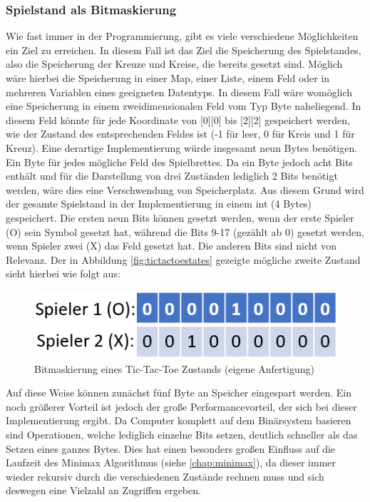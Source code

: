\subsubsection{Spielstand als Bitmaskierung}
Wie fast immer in der Programmierung, gibt es viele verschiedene Möglichkeiten ein Ziel zu erreichen. In diesem Fall ist das Ziel die Speicherung des
Spielstandes, also die Speicherung der Kreuze und Kreise, die bereits gesetzt sind. Möglich wäre hierbei die Speicherung in einer Map, einer Liste, 
einem Feld oder in mehreren Variablen eines geeigneten Datentyps. In diesem Fall wäre womöglich eine Speicherung in einem zweidimensionalen Feld vom Typ
Byte naheliegend. In diesem Feld könnte für jede Koordinate von [0][0] bis [2][2] gespeichert werden, wie der Zustand des entsprechenden Feldes ist (-1 für
leer, 0 für Kreis und 1 für Kreuz). Eine derartige Implementierung würde insgesamt neun Bytes benötigen. Ein Byte für jedes mögliche Feld des Spielbrettes.
Da ein Byte jedoch acht Bits enthält und für die Darstellung von drei Zuständen lediglich 2 Bits benötigt werden, wäre dies eine Verschwendung von Speicherplatz.
Aus diesem Grund wird der gesamte Spielstand in der Implementierung in einem int (4 Bytes) gespeichert. Die ersten neun Bits können gesetzt werden, wenn der erste
Spieler (O) sein Symbol gesetzt hat, während die Bits 9-17 (gezählt ab 0) gesetzt werden, wenn Spieler zwei (X) das Feld gesetzt hat. Die anderen Bits sind nicht
von Relevanz. Der in Abbildung \ref{fig:tictactoestates} gezeigte mögliche zweite Zustand sieht hierbei wie folgt aus:
\begin{figure}[H]
    \centering
    \includegraphics[scale=0.45]{img/bitmaskierung.png}
    \caption[Bitmaskierung eines Tic-Tac-Toe Zustands]{Bitmaskierung eines Tic-Tac-Toe Zustands (eigene Anfertigung)}
\end{figure}
Auf diese Weise können zunächst fünf Byte an Speicher eingespart werden. Ein noch größerer Vorteil ist jedoch der große Performancevorteil, der sich bei dieser
Implementierung ergibt. Da Computer komplett auf dem Binärsystem basieren sind Operationen, welche lediglich einzelne Bits setzen, deutlich schneller als das
Setzen eines ganzes Bytes. Dies hat einen besonders großen Einfluss auf die Laufzeit des Minimax Algorithmus (siehe \ref{chap:minimax}), da dieser immer wieder
rekursiv durch die verschiedenen Zustände rechnen muss und sich deswegen eine Vielzahl an Zugriffen ergeben.


